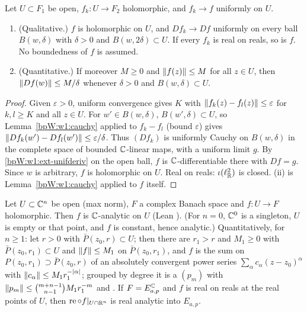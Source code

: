 \begin{lemma}\label{bpW:w1:uniform-limit}
Let $U\subset F_1$ be open, $f_k:U\to F_2$ holomorphic, and $f_k\to f$ uniformly on $U$.
\begin{enumerate}[label=(\roman*)]
\item (Qualitative.) $f$ is holomorphic on $U$, and $Df_k\to Df$ uniformly on every ball $B(w,\delta)$ with $\delta>0$
  and $B(w,2\delta)\subset U$. If every $f_k$ is real on reals, so is $f$. No boundedness of $f$ is assumed.
\item (Quantitative.) If moreover $M\ge0$ and $\lVert f(z)\rVert\le M$ for all $z\in U$, then $\lVert Df(w)\rVert\le M/\delta$
  whenever $\delta>0$ and $B(w,\delta)\subset U$.
\end{enumerate}
\end{lemma}

\begin{proof}
\label{stepW:w1:ulcauchy}
Given $\varepsilon>0$, uniform convergence gives $K$ with $\lVert f_k(z)-f_l(z)\rVert\le\varepsilon$ for $k,l\ge K$ and all
$z\in U$. For $w'\in B(w,\delta)$, $B(w',\delta)\subset U$, so Lemma~\ref{bpW:w1:cauchy} applied to $f_k-f_l$ (bound
$\varepsilon$) gives $\lVert Df_k(w')-Df_l(w')\rVert\le\varepsilon/\delta$. Thus $(Df_k)$ is uniformly Cauchy on $B(w,\delta)$ in the
complete space of bounded $\mathbb{C}$-linear maps, with a uniform limit $g$.
\label{stepW:w1:ullimit}
By \ref{bpW:w1:ext-unifderiv} on the open ball, $f$ is $\mathbb{C}$-differentiable there with $Df=g$. Since $w$ is
arbitrary, $f$ is holomorphic on $U$. Real on reals: $\iota(\ell^2_{\mathbb{R}})$ is closed. (ii) is Lemma~\ref{bpW:w1:cauchy}
applied to $f$ itself.
\end{proof}

\begin{lemma}\label{bpW:w1:holo-analytic-fd}
Let $U\subset\mathbb{C}^n$ be open (max norm), $F$ a complex Banach space and $f:U\to F$ holomorphic. Then $f$ is $\mathbb{C}$-analytic
on $U$ (Lean ). (For $n=0$, $\mathbb{C}^0$ is a singleton, $U$ is empty or that point, and $f$
is constant, hence analytic.) Quantitatively, for $n\ge1$: let $r>0$ with $\bar P(z_0,r)\subset U$; then there are
$r_1>r$ and $M_1\ge0$ with $\bar P(z_0,r_1)\subset U$ and $\lVert f\rVert\le M_1$ on $\bar P(z_0,r_1)$, and $f$ is the sum
on $P(z_0,r_1)\supset\bar P(z_0,r)$ of an absolutely convergent power series $\sum_\alpha c_\alpha(z-z_0)^\alpha$ with
$\lVert c_\alpha\rVert\le M_1r_1^{-\lvert \alpha\rvert}$; grouped by degree it is a  $(p_m)$ with
$\lVert p_m\rVert\le\binom{m+n-1}{n-1}M_1r_1^{-m}$ and .
If $F=E^{\mathbb{C}}_{a,p}$ and $f$ is real on reals at the real points of $U$, then
$\operatorname{re}\circ f|_{U\cap\mathbb{R}^n}$ is real analytic into $E_{a,p}$.
\end{lemma}

